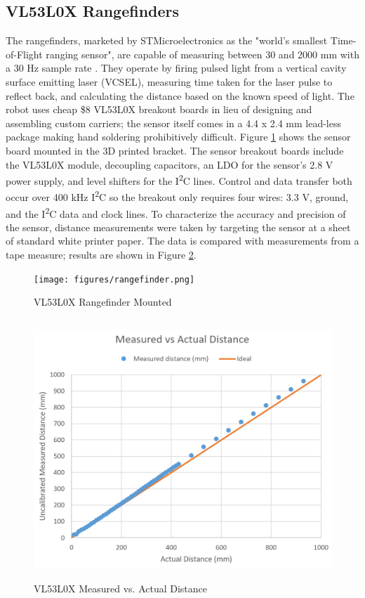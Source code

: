 \subsection{VL53L0X Rangefinders}
The rangefinders, marketed by STMicroelectronics as the "world's smallest Time-of-Flight ranging sensor", are capable of measuring between 30 and 2000 mm with a 30 Hz sample rate \cite{vl53l0x}. They operate by firing pulsed light from a vertical cavity surface emitting laser (VCSEL), measuring time taken for the laser pulse to reflect back, and calculating the distance based on the known speed of light. The robot uses cheap \$8 VL53L0X breakout boards in lieu of designing and assembling custom carriers; the sensor itself comes in a 4.4 x 2.4 mm lead-less package making hand soldering prohibitively difficult. Figure \ref{fig:rangefinder} shows the sensor board mounted in the 3D printed bracket. The sensor breakout boards include the VL53L0X module, decoupling capacitors, an LDO for the sensor's 2.8 V power supply, and level shifters for the I\textsuperscript{2}C lines. Control and data transfer both occur over 400 kHz I\textsuperscript{2}C so the breakout only requires four wires: 3.3 V, ground, and the I\textsuperscript{2}C data and clock lines. To characterize the accuracy and precision of the sensor, distance measurements were taken by targeting the sensor at a sheet of standard white printer paper. The data is compared with measurements from a tape measure; results are shown in Figure \ref{fig:rangefinder_measurement}. 
\begin{figure}[H]   %
	\centering \texttt{[image: figures/rangefinder.png]}
	\caption{VL53L0X Rangefinder Mounted}\label{fig:rangefinder}
\end{figure}
\begin{figure}[H]   %
	\centering \includegraphics[width=6in, height=3.85in, keepaspectratio]{figures/rangefinder_measurement.png}
	\caption{VL53L0X Measured vs. Actual Distance}\label{fig:rangefinder_measurement}
\end{figure}
